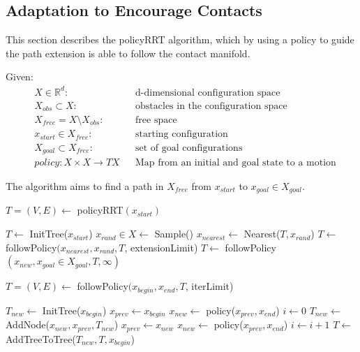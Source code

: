 \documentclass[../thesis.tex]{subfiles}
\begin{document}
\subsection{Adaptation to Encourage Contacts}
This section describes the policyRRT algorithm, which by using a policy to guide the path extension is able to follow the contact manifold.

Given:
\begin{align}
    &X \in \mathbb{R}^d:     &&\text{d-dimensional configuration space}\\
    &X_{obs} \subset X:      &&\text{obstacles in the configuration space}\\
    &X_{free} = X \setminus X_{obs}:   &&\text{free space}\\
    &x_{start} \in X_{free}:  &&\text{starting configuration}\\
    &X_{goal} \subset X_{free}: &&\text{set of goal configurations}\\
    &policy: X \times X \rightarrow TX &&\text{Map from an initial and goal state to a motion}
\end{align}

The algorithm aims to find a path in $X_{free}$ from $x_{start}$ to $x_{goal} \in X_{goal}$.


\begin{algorithm}
\caption{$T=(V,E) \leftarrow$ policyRRT$(x_{start})$}\label{euclid}
\begin{algorithmic}[1]
\State $T \leftarrow$ InitTree($x_{start}$)
\State $x_{rand} \in X \leftarrow$ Sample()
\State $x_{nearest} \leftarrow $ Nearest($T, x_{rand}$)
\State $T \leftarrow $ followPolicy$(x_{nearest}, x_{rand}, T$, extensionLimit)
\State $T \leftarrow $ followPolicy$(x_{new}, x_{goal} \in X_{goal}, T, \infty)$
\EndIf
\EndWhile
\end{algorithmic}
\end{algorithm}

\begin{algorithm}
\caption{$T=(V,E) \leftarrow$ followPolicy$(x_{begin}, x_{end}, T$, iterLimit)}\label{euclid}
\begin{algorithmic}[1]
\State $T_{new} \leftarrow $ InitTree($x_{begin}$)
\State $x_{prev} \leftarrow x_{begin}$
\State $x_{new} \leftarrow $ policy($x_{prev}, x_{end}$)
\State $i \leftarrow 0$
\State $T_{new} \leftarrow $ AddNode($x_{new}, x_{prev}, T_{new}$)
\State $x_{prev} \leftarrow x_{new}$ 
\State $x_{new} \leftarrow $ policy($x_{prev}, x_{end}$)
\State $i \leftarrow i+1$
\EndWhile
\State $T \leftarrow $ AddTreeToTree($T_{new}, T, x_{begin}$)
\end{algorithmic}
\end{algorithm}
\end{document}
